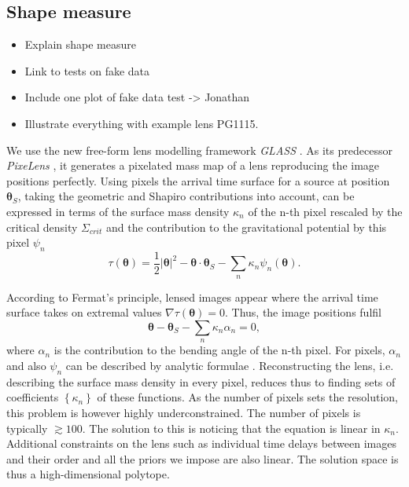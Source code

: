 \documentclass[useAMS,usenatbib]{mn2e}
\begin{document}
\subsection{Shape measure}
\begin{itemize}
\item Explain shape measure
\item Link to tests on fake data
\item Include one plot of fake data test -> Jonathan
\item Illustrate everything with example lens PG1115.
\end{itemize}

We use the new free-form lens modelling framework \textit{GLASS} \citep{2012MNRAS.425.3077L}. As its predecessor \textit{PixeLens} \citep{2004AJ....127.2604S}, it generates a pixelated mass map of a lens reproducing the image positions perfectly. Using pixels the arrival time surface for a source at position $\boldsymbol\theta_{S}$, taking the geometric and Shapiro contributions into account, can be expressed in terms of the surface mass density $\kappa_{n}$ of the n-th pixel rescaled by the critical density $\Sigma_{crit}$ and the contribution to the gravitational potential by this pixel $\psi_{n}$ \citep{1997MNRAS.292..148S}
\begin{equation}\label{eq:arrival}
\tau(\boldsymbol\theta)=\frac{1}{2}|\boldsymbol\theta |^{2}-\boldsymbol\theta\cdot\boldsymbol\theta_{S}-\displaystyle\sum\limits_{n} \kappa_{n}\psi_{n}(\boldsymbol\theta).
\end{equation}

According to Fermat's principle, lensed images appear where the arrival time surface takes on extremal values $\nabla\tau(\boldsymbol\theta)=0$. Thus, the image positions fulfil
\begin{equation}
\boldsymbol\theta-\boldsymbol\theta_{S}-\displaystyle\sum\limits_{n} \kappa_{n}\alpha_{n}=0,
\end{equation}
where $\alpha_{n}$ is the contribution to the bending angle of the n-th pixel. For pixels, $\alpha_{n}$ and also $\psi_{n}$ can be described by analytic formulae \citep{1997MNRAS.292..148S}. Reconstructing the lens, i.e. describing the surface mass density in every pixel, reduces thus to finding sets of coefficients $\left\{\kappa_{n}\right\}$ of these functions. As the number of pixels sets the resolution, this problem is however highly underconstrained. The number of pixels is typically $\gtrsim100$. The solution to this is noticing that the equation is linear in $\kappa_{n}$. Additional constraints on the lens such as individual time delays between images and their order and all the priors we impose are also linear. The solution space is thus a high-dimensional polytope.
\end{document}
